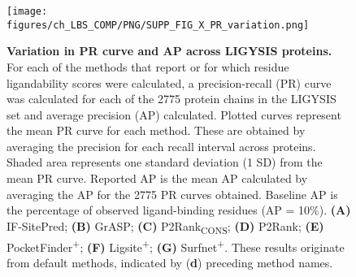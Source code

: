 \begin{figure}[htb!]
    \centering
    \texttt{[image: figures/ch\_LBS\_COMP/PNG/SUPP\_FIG\_X\_PR\_variation.png]}
    \caption[Variation in PR curve and AP across LIGYSIS proteins]{\textbf{Variation in PR curve and AP across LIGYSIS proteins.} For each of the methods that report or for which residue ligandability scores were calculated, a precision-recall (PR) curve was calculated for each of the 2775 protein chains in the LIGYSIS set and average precision (AP) calculated. Plotted curves represent the mean PR curve for each method. These are obtained by averaging the precision for each recall interval across proteins. Shaded area represents one standard deviation (1 SD) from the mean PR curve. Reported AP is the mean AP calculated by averaging the AP for the 2775 PR curves obtained. Baseline AP is the percentage of observed ligand-binding residues (AP = 10\%). \textbf{(A)} IF-SitePred; \textbf{(B)} GrASP; \textbf{(C)} P2Rank\textsubscript{CONS}; \textbf{(D)} P2Rank; \textbf{(E)} PocketFinder\textsuperscript{+}; \textbf{(F)} Ligsite\textsuperscript{+}; \textbf{(G)} Surfnet\textsuperscript{+}. These results originate from default methods, indicated by (\textbf{d}) preceding method names.}
    \label{fig:PR_variation}
\end{figure}

\FloatBarrier

